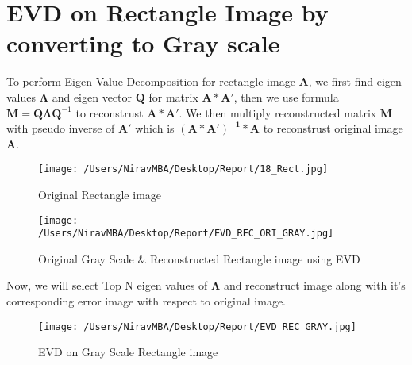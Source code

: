 \documentclass[12pt]{report}
\begin{document}
\cleardoublepage

%

\section{EVD on Rectangle Image by converting to Gray scale}

To perform Eigen Value Decomposition for rectangle image $ \mathbf{A} $, we first find eigen values $ \mathbf{\Lambda} $ and eigen vector $ \mathbf{Q} $ for matrix $ \mathbf{A*A'} $, then we use formula $ \mathbf{M}=\mathbf{Q}\mathbf{\Lambda}\mathbf{Q}^{-1}  $  to reconstrust $ \mathbf{A*A'} $. We then multiply reconstructed matrix $ \mathbf{M} $ with pseudo inverse of $ \mathbf{A'} $ which is $ \mathbf{ (A*A')^{-1}*A } $ to reconstrust original image $ \mathbf{A} $.

\begin{figure}[H]
	\centering
	\texttt{[image: /Users/NiravMBA/Desktop/Report/18\_Rect.jpg]}
	\caption{Original Rectangle image}
\end{figure}


\begin{figure}[H]
	
	\texttt{[image: /Users/NiravMBA/Desktop/Report/EVD\_REC\_ORI\_GRAY.jpg]}
	\caption{Original Gray Scale \& Reconstructed Rectangle image using EVD}
\end{figure}
\cleardoublepage


Now, we will select Top N eigen values of $ \mathbf{\Lambda} $ and reconstruct image along with it's corresponding error image with respect to original image.\\

\begin{figure}[H]
	
	\texttt{[image: /Users/NiravMBA/Desktop/Report/EVD\_REC\_GRAY.jpg]}
	\caption{EVD on Gray Scale Rectangle image}
\end{figure}
\cleardoublepage
%
%	
\end{document}
